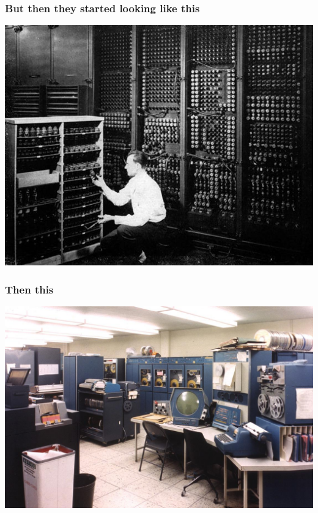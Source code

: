 \documentclass{beamer}
\begin{document}
\begin{frame}
  \frametitle{But then they started looking like this}

  \begin{center}
    \includegraphics[width=\textwidth]{img/eniac.jpg}
  \end{center}
\end{frame}

\begin{frame}
  \frametitle{Then this}
  \begin{center}
    \includegraphics[width=\textwidth]{img/pdp1.jpg}
  \end{center}
\end{frame}
\end{document}
